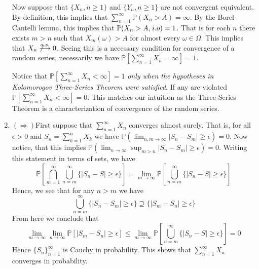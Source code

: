 \documentclass[12pt]{article}  %
\newcommand{\e}{{\epsilon}}
\newcommand{\prob}{{\mathbb{P}}}
\begin{document}
\begin{enumerate}
Now suppose that $\{X_n, n\geq 1\}$ and $\{Y_n, n\geq 1\}$ are not convergent equivalent. By definition, this implies that $\sum_{n=1}^{\infty}\prob(X_n>A) = \infty$. By the Borel-Cantelli lemma, this implies that $\prob(X_n>A,\hspace{.1em}i.o) = 1$. That is for each $n$ there exists $m>n$ such that $X_m(\omega)>A$ for almost every $\omega\in\Omega$. This implies that $X_n\not\overset{a.s.}{\longrightarrow}0$. Seeing this is a necessary condition for convergence of a random series, necessarily we have $\prob\left[\sum_{n=1}^{\infty}X_n = \infty\right] = 1$. 

Notice that $\prob\left[\sum_{n=1}^{\infty}X_n<\infty\right] = 1$ \textit{only when the hypotheses in Kolomorogov Three-Series Theorem were satisfied}. If any are violated $\prob\left[\sum_{n=1}^{\infty}X_n<\infty\right] = 0$. This matches our intuition as the Three-Series Theorem is a characterization of convergence of the random series. 


\item $(\Longrightarrow)$First suppose that $\sum_{n=1}^{\infty}X_n$ converges almost surely. That is, for all $\e>0$ and $S_n = \sum_{k=1}^nX_k$ we have $\prob(\lim_{n,m\to\infty}|S_n - S_m|\geq\e) = 0$. Now notice, that this implies $\prob(\lim_{n\to\infty}\sup_{m>n}|S_n - S_m|\geq \e) = 0$. Writing this statement in terms of sets, we have $$\prob\left[\bigcap_{m=1}^{\infty}\bigcup_{n=m}^{\infty}\{|S_n-S|\geq \e\}\right] =  \lim_{m\to\infty}\prob\left[\bigcup_{n=m}^{\infty}\{|S_n-S|\geq \e\}\right]$$ Hence, we see that for any $n>m$ we have $$\bigcup_{n=m}^{\infty}\{|S_n-S_m|\geq \e\}\supseteq \{|S_m-S_n|\geq \e\}$$ From here we conclude that $$\lim_{m\to\infty}\lim_{n\to\infty}\prob[|S_m-S_n|\geq \e]\leq\lim_{m\to\infty}\prob\left[\bigcup_{n=m}^{\infty}\{|S_n-S|\geq \e\}\right] = 0$$ Hence $\{S_n\}_{n=1}^{\infty}$ is Cauchy in probability. This shows that $\sum_{n=1}^{\infty}X_n$ converges in probability.



\end{enumerate}
\end{document}
